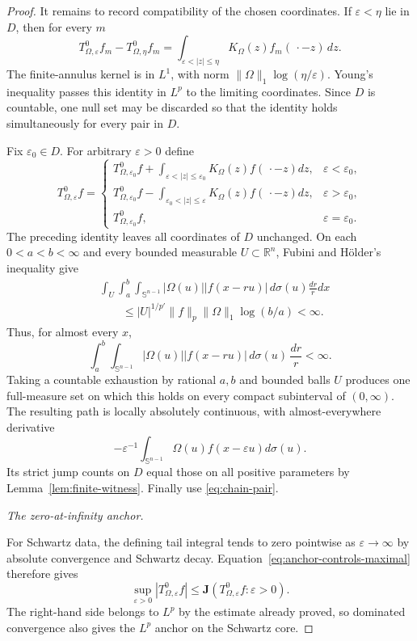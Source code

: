 \documentclass[11pt]{article}
\numberwithin{equation}{section}
\theoremstyle{remark}
\theoremstyle{definition}
\newcommand{\R}{\mathbb R}
\newcommand{\Sph}{\mathbb S}
\newcommand{\norm}[1]{\lVert #1\rVert}
\begin{document}
\begin{proof}
It remains to record compatibility of the chosen coordinates.  If
$\varepsilon<\eta$ lie in $D$, then for every $m$
\begin{equation}\label{eq:finite-annulus-identity}
 T^0_{\Omega,\varepsilon}f_m-T^0_{\Omega,\eta}f_m
 =\int_{\varepsilon<|z|\le\eta}K_\Omega(z)f_m(\,\cdot-z)\,dz.
\end{equation}
The finite-annulus kernel is in $L^1$, with norm
$\norm\Omega_1\log(\eta/\varepsilon)$.  Young's inequality passes this
identity in $L^p$ to the limiting coordinates.  Since $D$ is countable,
one null set may be discarded so that the identity holds simultaneously
for every pair in $D$.

Fix $\varepsilon_0\in D$.  For arbitrary $\varepsilon>0$ define
\[
 T^0_{\Omega,\varepsilon}f=
 \begin{cases}
 T^0_{\Omega,\varepsilon_0}f+
 \displaystyle\int_{\varepsilon<|z|\le\varepsilon_0}
 K_\Omega(z)f(\,\cdot-z)dz,&\varepsilon<\varepsilon_0,\\[1.2ex]
 T^0_{\Omega,\varepsilon_0}f-
 \displaystyle\int_{\varepsilon_0<|z|\le\varepsilon}
 K_\Omega(z)f(\,\cdot-z)dz,&\varepsilon>\varepsilon_0,\\[1.2ex]
 T^0_{\Omega,\varepsilon_0}f,&\varepsilon=\varepsilon_0.
 \end{cases}
\]
The preceding identity leaves all coordinates of $D$ unchanged.  On each
$0<a<b<\infty$ and every bounded measurable $U\subset\R^n$, Fubini and
H\"older's inequality give
\begin{align*}
 &\int_U\int_a^b\int_{\Sph^{n-1}}|\Omega(u)|
 |f(x-ru)|\,d\sigma(u)\frac{dr}{r}dx\\
 &\qquad\le |U|^{1/p'}\|f\|_p\|\Omega\|_1\log(b/a)<\infty.
\end{align*}
Thus, for almost every $x$,
\[
 \int_a^b\int_{\Sph^{n-1}}|\Omega(u)|
 |f(x-ru)|\,d\sigma(u)\,\frac{dr}{r}<\infty.
\]
Taking a countable exhaustion by rational $a,b$ and bounded balls $U$
produces one full-measure set on which this holds on every compact
subinterval of $(0,\infty)$.
The resulting path is locally absolutely continuous, with almost-everywhere
derivative
\[
 -\varepsilon^{-1}\int_{\Sph^{n-1}}
   \Omega(u)f(x-\varepsilon u)d\sigma(u).
\]
Its strict jump counts on $D$ equal those on all positive parameters by
Lemma~\ref{lem:finite-witness}.  Finally use \eqref{eq:chain-pair}.

\smallskip
\noindent\emph{The zero-at-infinity anchor.}

For Schwartz data, the defining tail integral tends to zero pointwise as
$\varepsilon\to\infty$ by absolute convergence and Schwartz decay.
Equation~\eqref{eq:anchor-controls-maximal} therefore gives
\[
 \sup_{\varepsilon>0}|T^0_{\Omega,\varepsilon}f|
 \le\mathbf J(T^0_{\Omega,\varepsilon}f:\varepsilon>0).
\]
The right-hand side belongs to $L^p$ by the estimate already proved, so
dominated convergence also gives the $L^p$ anchor on the Schwartz core.


\end{proof}
\end{document}
